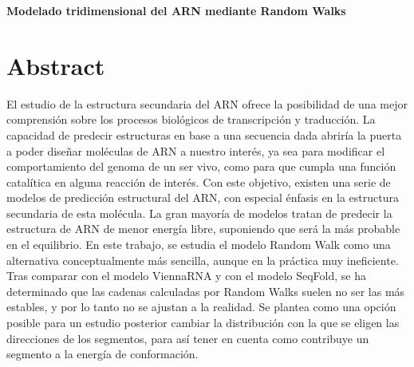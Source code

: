 \documentclass[a4paper,11pt,titlepage]{article}
\theoremstyle{definition}
\begin{document}

%
%
\newpage



\newpage

\setcounter{page}{1}
\tableofcontents

\newpage

\begin{center}
\Large\centering\textbf{Modelado tridimensional del ARN mediante Random Walks}
\end{center}

\section{Abstract}\label{sec:summary}

El estudio de la estructura secundaria del ARN ofrece la posibilidad de una mejor comprensión sobre los procesos biológicos de transcripción y traducción. La capacidad de predecir estructuras en base a una secuencia dada abriría la puerta a poder diseñar moléculas de ARN a nuestro interés, ya sea para modificar el comportamiento del genoma de un ser vivo, como para que cumpla una función catalítica en alguna reacción de interés. Con este objetivo, existen una serie de modelos de predicción estructural del ARN, con especial énfasis en la estructura secundaria de esta molécula. La gran mayoría de modelos tratan de predecir la estructura de ARN de menor energía libre, suponiendo que será la más probable en el equilibrio. En este trabajo, se estudia el modelo Random Walk como una alternativa conceptualmente más sencilla, aunque en la práctica muy ineficiente. Tras comparar con el modelo ViennaRNA y con el modelo SeqFold, se ha determinado que las cadenas calculadas por Random Walks suelen no ser las más estables, y por lo tanto no se ajustan a la realidad. Se plantea como una opción posible para un estudio posterior cambiar la distribución con la que se eligen las direcciones de los segmentos, para así tener en cuenta como contribuye un segmento a la energía de conformación.
\end{document}
